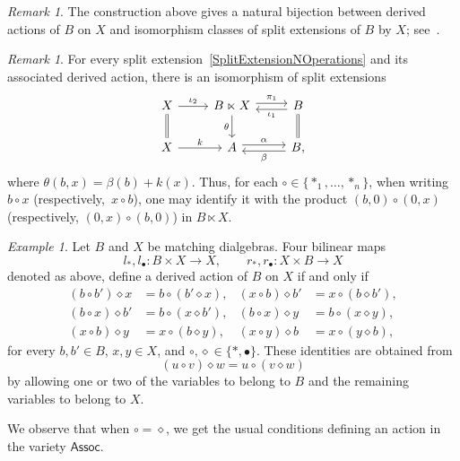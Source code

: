 \documentclass[reqno,a4paper]{amsart}
\theoremstyle{plain}
\theoremstyle{definition}
\theoremstyle{remark}
\newtheorem{remark}[subsection]{Remark}
\newtheorem{example}[subsection]{Example}
\numberwithin{equation}{section}
\newcommand{\Assoc}{\ensuremath{\mathsf{Assoc}}}
\begin{document}
\begin{remark}
The construction above gives a natural bijection between derived actions of $B$ on $X$ and isomorphism classes of split extensions of $B$ by $X$; see~\cite[Theorem~3.17]{SurveyActions}.
\end{remark}

\begin{remark}\label{rem_b*}
For every split extension~\eqref{SplitExtensionNOperations} and its associated derived
action, there is an isomorphism of split extensions
\begin{equation*}
\begin{tikzcd}
X
    \arrow[r, "\iota_2"]
    \arrow[d, equal]
&
B\ltimes X
    \arrow[r, shift left, "\pi_1"]
    \arrow[d, "\theta"']
&
B
    \arrow[l, shift left, "\iota_1"]
    \arrow[d, equal]
\\
X \arrow[r, "k"]
&
A \arrow[r, shift left, "\alpha"]
&
B \arrow[l, shift left, "\beta"],
\end{tikzcd}
\end{equation*}
where
$\theta
(b,x)=\beta(b)+k(x)$.
Thus, for each $\circ\in\{\ast_1,\ldots,\ast_n\}$, when writing $b\mathbin{\circ}x$ (respectively,~$x\mathbin{\circ}b$), one may identify it with the product $(b,0)\mathbin{\circ}(0,x)$ (respectively, $(0,x)\mathbin{\circ}(b,0)$) in $B\ltimes X$.
\end{remark}

\begin{example}\label{DerivedActionMatching}
Let $B$ and $X$ be matching dialgebras. Four bilinear maps
\[
l_\ast, l_\bullet \colon B\times X\to X,\qquad r_\ast, r_\bullet \colon X\times B\to X
\]
denoted as above, define a derived action of $B$ on $X$ if and only if
\begin{align*}
(b\circ b')\diamond x&=b\circ(b'\diamond x),&
(x\circ b)\diamond b'&=x\circ(b\diamond b'),\\
(b\circ x)\diamond b'&=b\circ(x\diamond b'),&
(b\circ x)\diamond y&=b\circ(x\diamond y),\\
(x\circ b)\diamond y&=x\circ(b\diamond y),&
(x\circ y)\diamond b&=x\circ(y\diamond b),
\end{align*}
for every $b,b'\in B$, $x,y\in X$, and $\circ,\diamond\in\{\ast,\bullet\}$. These identities are obtained from
\[
(u\circ v)\diamond w=u\circ(v\diamond w)
\]
by allowing one or two of the variables to belong to $B$ and the remaining variables to belong to $X$.

We observe that when $\circ=\diamond$, we get the usual conditions defining an action in the variety $\Assoc$.
\end{example}
\end{document}

